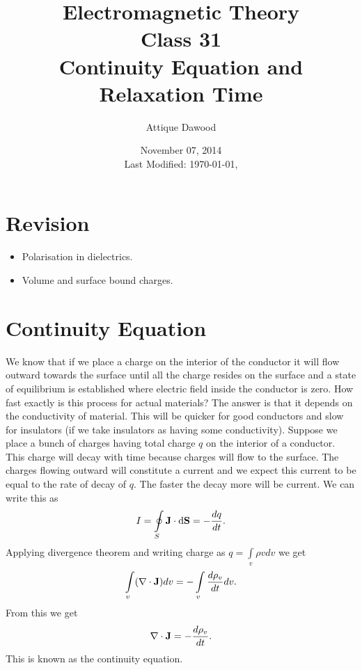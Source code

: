 \documentclass[12pt,a4paper]{article}
\title{Electromagnetic Theory\\Class 31\\Continuity Equation and Relaxation Time}
\author{Attique Dawood}
\date{November 07, 2014\\[0.2cm] Last Modified: \today, \currenttime}
\begin{document}
\maketitle
\section{Revision}
\begin{itemize}
\item Polarisation in dielectrics.
\item Volume and surface bound charges.
\end{itemize}
\section{Continuity Equation}
We know that if we place a charge on the interior of the conductor it will flow outward towards the surface until all the charge resides on the surface and a state of equilibrium is established where electric field inside the conductor is zero. How fast exactly is this process for actual materials? The answer is that it depends on the conductivity of material. This will be quicker for good conductors and slow for insulators (if we take insulators as having some conductivity). Suppose we place a bunch of charges having total charge $q$ on the interior of a conductor. This charge will decay with time because charges will flow to the surface. The charges flowing outward will constitute a current and we expect this current to be equal to the rate of decay of $q$. The faster the decay more will be current. We can write this as
\begin{equation}
I=\oint\limits_S\mathrm{\textbf J}\cdot\mathrm{d\textbf{S}}=-\dfrac{dq}{dt}.
\end{equation}
Applying divergence theorem and writing charge as $q=\int\limits_v\rho v dv$ we get
\begin{equation}
\int\limits_v(\nabla\cdot\mathrm{\textbf J})dv=-\int\limits_v\dfrac{d\rho_v}{dt}dv.
\end{equation}
From this we get
\begin{equation}
\nabla\cdot\mathrm{\textbf J}=-\dfrac{d\rho_v}{dt}.
\end{equation}
This is known as the continuity equation.
\end{document}
